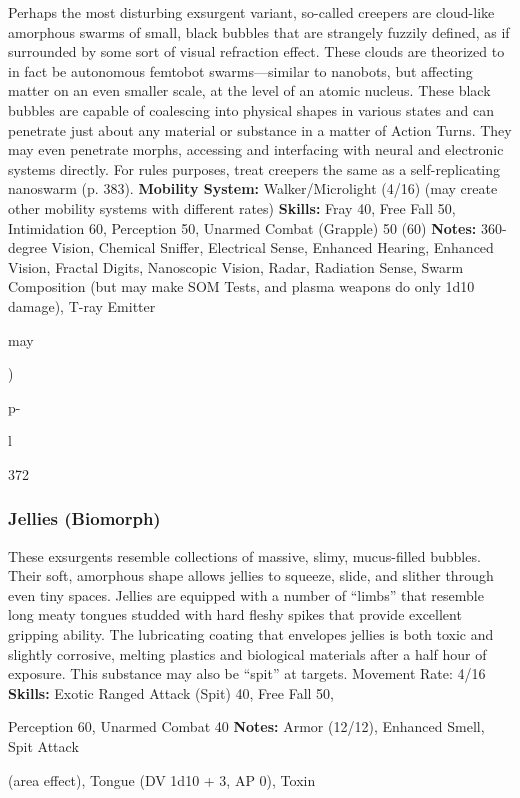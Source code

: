 Perhaps the most disturbing exsurgent variant, so-called
creepers are cloud-like amorphous swarms of
small, black bubbles that are strangely fuzzily defined, 
as if surrounded by some sort of visual refraction effect. 
These clouds are theorized to in fact be autonomous 
femtobot swarms—similar to nanobots, but affecting 
matter on an even smaller scale, at the level of an atomic 
nucleus. These black bubbles are capable of coalescing 
into physical shapes in various states and can penetrate 
just about any material or substance in a matter of 
Action Turns. They may even penetrate morphs, accessing
and interfacing with neural and electronic systems
directly. For rules purposes, treat creepers the same as a 
self-replicating nanoswarm (p. 383).
\textbf{Mobility System: }Walker/Microlight (4/16) (may 
create other mobility systems with different rates)
\textbf{Skills:} Fray 40, Free Fall 50, Intimidation 60, Perception
50, Unarmed Combat (Grapple) 50 (60)
\textbf{Notes: }360-degree Vision, Chemical Sniffer, Electrical 
Sense, Enhanced Hearing, Enhanced Vision, Fractal
Digits, Nanoscopic Vision, Radar, Radiation
Sense, Swarm Composition (but may make SOM 
Tests, and plasma weapons do only 1d10 damage), 
T-ray Emitter

may 

)

p-

l 


372

\subsubsection{Jellies (Biomorph)}

These exsurgents resemble collections of massive, slimy, 
mucus-filled bubbles. Their soft, amorphous shape 
allows jellies to squeeze, slide, and slither through 
even tiny spaces. Jellies are equipped with a number 
of ``limbs'' that resemble long meaty tongues studded 
with hard fleshy spikes that provide excellent gripping 
ability. The lubricating coating that envelopes jellies is 
both toxic and slightly corrosive, melting plastics and 
biological materials after a half hour of exposure. This 
substance may also be ``spit'' at targets.
\textbf{ }
Movement Rate: 4/16
\textbf{Skills:} Exotic Ranged Attack (Spit) 40, Free Fall 50, 

Perception 60, Unarmed Combat 40
\textbf{Notes:} Armor (12/12), Enhanced Smell, Spit Attack 

(area effect), Tongue (DV 1d10 + 3, AP 0), Toxin 

